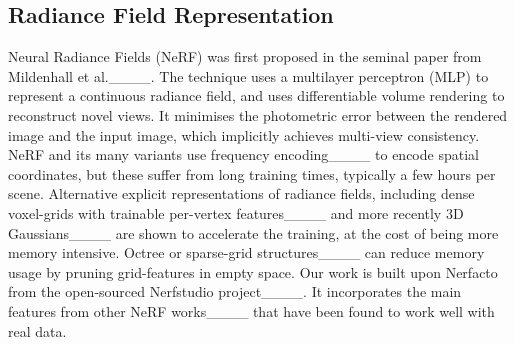 \subsection{Radiance Field Representation}
Neural Radiance Fields (NeRF) was first proposed in the seminal paper from Mildenhall et al.____. The technique uses a multilayer perceptron (MLP) to represent a continuous radiance field, and uses differentiable volume rendering to reconstruct novel views. It minimises the photometric error between the rendered image and the input image, which implicitly achieves multi-view consistency.
NeRF and its many variants use frequency encoding____ to encode spatial coordinates, but these suffer from long training times, typically a few hours per scene. Alternative explicit representations of radiance fields, including dense voxel-grids with trainable per-vertex features____ and more recently 3D Gaussians____ are shown to accelerate the training, at the cost of being more memory intensive.
Octree or sparse-grid structures____ can reduce memory usage by pruning grid-features in empty space. 
Our work is built upon Nerfacto from the open-sourced Nerfstudio project____. It incorporates the main features from other NeRF works____ that have been found to work well with real data.


